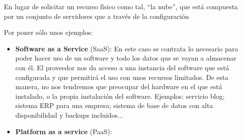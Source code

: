 En lugar de solicitar un recurso físico como tal, “la nube”, que está compuesta por un conjunto de servidores que a través de la configuración


Por poner sólo unos ejemplos:




\begin{itemize}
    \item \textbf{Software as a Service} (SaaS): En este caso se contrata lo necesario para poder hacer uso de un software y todo los datos que se vayan a almacenar con él. El proveedor nos da acceso a una instancia del software que está configurada y que permitirá el uso con unos recursos limitados. De esta manera, no nos tendremos que preocupar del hardware en el que está instalado, o la propia instalación del software. Ejemplos: servicio blog; sistema ERP para una empresa; sistema de base de datos con alta disponibilidad y backups incluidos...

    \item \textbf{Platform as a service} (PaaS):
\end{itemize}